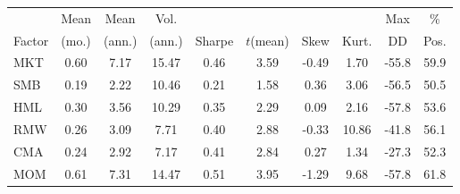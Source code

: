 \begin{tabular}{lccccccccc}
\toprule
 & Mean & Mean & Vol. & & & & & Max & \% \\
Factor & (mo.) & (ann.) & (ann.) & Sharpe & $t$(mean) & Skew & Kurt. & DD & Pos. \\
\midrule
MKT & 0.60 & 7.17 & 15.47 & 0.46 & 3.59 & -0.49 & 1.70 & -55.8 & 59.9 \\
SMB & 0.19 & 2.22 & 10.46 & 0.21 & 1.58 & 0.36 & 3.06 & -56.5 & 50.5 \\
HML & 0.30 & 3.56 & 10.29 & 0.35 & 2.29 & 0.09 & 2.16 & -57.8 & 53.6 \\
RMW & 0.26 & 3.09 & 7.71 & 0.40 & 2.88 & -0.33 & 10.86 & -41.8 & 56.1 \\
CMA & 0.24 & 2.92 & 7.17 & 0.41 & 2.84 & 0.27 & 1.34 & -27.3 & 52.3 \\
MOM & 0.61 & 7.31 & 14.47 & 0.51 & 3.95 & -1.29 & 9.68 & -57.8 & 61.8 \\
\bottomrule
\end{tabular}
